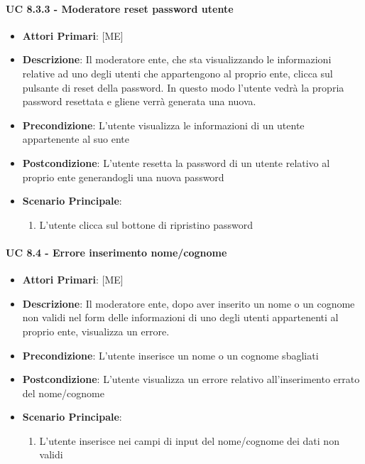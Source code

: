 			\paragraph{UC 8.3.3 - Moderatore reset password utente}
			\begin{itemize}
				\item \textbf{Attori Primari}: [ME]
				\item \textbf{Descrizione}: Il moderatore ente, che sta visualizzando le informazioni relative ad uno degli utenti che appartengono al proprio ente, clicca sul pulsante di reset della password. In questo modo l'utente vedrà la propria password resettata e gliene verrà generata una nuova. 
				\item \textbf{Precondizione}: L'utente visualizza le informazioni di un utente appartenente al suo ente
				\item \textbf{Postcondizione}: L'utente resetta la password di un utente relativo al proprio ente generandogli una nuova password
				\item \textbf{Scenario Principale}:
				\begin{enumerate}
					\item{L'utente clicca sul bottone di ripristino password}
				\end{enumerate}	
			\end{itemize}

			\paragraph{UC 8.4 - Errore inserimento nome/cognome}
			\begin{itemize}
				\item \textbf{Attori Primari}: [ME]
				\item \textbf{Descrizione}: Il moderatore ente, dopo aver inserito un nome o un cognome non validi nel form delle informazioni di uno degli utenti appartenenti al proprio ente, visualizza un errore.
				\item \textbf{Precondizione}: L'utente inserisce un nome o un cognome sbagliati
				\item \textbf{Postcondizione}: L'utente visualizza un errore relativo all'inserimento errato del nome/cognome
				\item \textbf{Scenario Principale}:
				\begin{enumerate}
					\item{L'utente inserisce nei campi di input del nome/cognome dei dati non validi}
				\end{enumerate}	
			\end{itemize}

